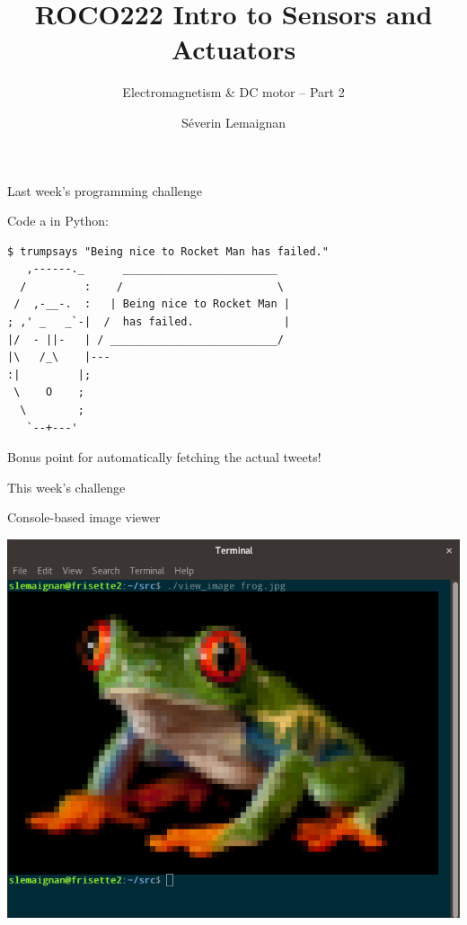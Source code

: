\documentclass[compress]{beamer}
\title{ROCO222 \newline Intro to Sensors and Actuators}
\subtitle{Electromagnetism \& DC motor -- Part 2}
\date{}
\author{Séverin Lemaignan}
\institute{Centre for Robotics and Neural Systems\\{\bf Plymouth University}}
\makeatletter
\def\beamer@writeslidentry@miniframesoff{%
  \expandafter\beamer@ifempty\expandafter{\beamer@framestartpage}{}%
  {%
    \clearpage\beamer@notesactions%
  }
}
\newcommand*{\miniframesoff}{\let\beamer@writeslidentry=\beamer@writeslidentry@miniframesoff}
\makeatother
\begin{document}



\maketitle

\miniframesoff
\begin{frame}[fragile]{Last week's programming challenge}

Code a  in Python:

\begin{verbatim}
$ trumpsays "Being nice to Rocket Man has failed."
   ,------._      ________________________
  /         :    /                        \
 /  ,-__-.  :   | Being nice to Rocket Man |
; ,' _   _`-|  /  has failed.              |
|/  - ||-   | / __________________________/
|\   /_\    |---
:|         |;
 \    O    ;
  \        ;
   `--+---'
\end{verbatim}

Bonus point for automatically fetching the actual tweets!

\end{frame}


\begin{frame}[fragile]{This week's challenge}

    \Large
    Console-based image viewer

        \begin{center}
            \includegraphics[width=0.7\linewidth]{coding-challenge-terminal-image}
        \end{center}

\end{frame}
\end{document}
